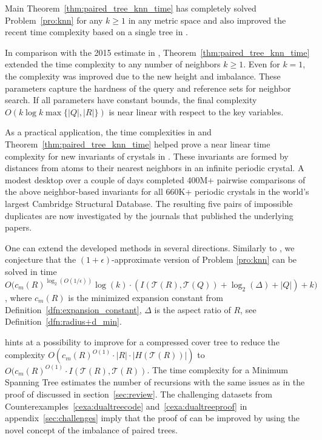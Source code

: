 \documentclass[a4paper,UKenglish,cleveref, autoref]{lipics-v2019}
\numberwithin{algocf}{section}
\theoremstyle{definition}
\theoremstyle{definition}
\theoremstyle{definition}
\theoremstyle{plain}
\newcommand{\T}{\mathcal{T}}
\newcommand{\ep}{\epsilon}
\begin{document}
Main Theorem~\ref{thm:paired_tree_knn_time} has completely solved Problem~\ref{pro:knn} for any $k\geq 1$ in any metric space and also improved the recent time complexity based on a single tree in \cite[Theorem~6.5]{elkin2021new}.
\medskip

In comparison with the 2015 estimate in \cite[Theorem~2]{curtin2015plug}, Theorem~\ref{thm:paired_tree_knn_time} extended the time complexity to any number of neighbors $k\geq 1$.
Even for $k=1$, the complexity was improved due to the new height and imbalance.
These parameters capture the hardness of the query and reference sets for neighbor search.
If all parameters have constant bounds, the final complexity $O(k\log k\max\{|Q|,|R|\})$ is near linear with respect to the key variables.
\medskip

As a practical application, the time complexities in \cite[Theorem~6.5]{elkin2021new} and Theorem~\ref{thm:paired_tree_knn_time} helped prove a near linear time complexity for new invariants of crystals in \cite[Theorem~14]{widdowson2022average}.
These invariants are formed by distances from atoms to their nearest neighbors in an infinite periodic crystal.
A modest desktop over a couple of days completed 400M+ pairwise comparisons of the above neighbor-based invariants for all 660K+ periodic crystals in the world's largest Cambridge Structural Database.
The resulting five pairs of impossible duplicates are now investigated by the journals that published the underlying papers.
\medskip

One can extend the developed methods in several directions.
Similarly to \cite[Theorem~7.4]{elkin2021new}, we conjecture that the $(1+\epsilon)$-approximate version of Problem \ref{pro:knn} can be solved in time $O\Big(c_m(R)^{\log_2(O(1/\ep))} \log(k) \cdot ( I(\T(R), \T(Q)) + \log_2(\Delta) + |Q|) + k \Big)$, where $c_m(R)$ is the minimized expansion constant from Definition~\ref{dfn:expansion_constant}, $\Delta$ is the aspect ratio of $R$, see Definition~\ref{dfn:radius+d_min}. 
\medskip

\cite[Section~2.3.1]{beygelzimer2006coverExtend} hints at a possibility to improve \cite[Algorithm~4.3]{elkin2021new} for a compressed cover tree to reduce the complexity $O(c_m(R)^{O(1)} \cdot |R| \cdot |H(\T(R))|)$ to $O(c_m(R)^{O(1)}\cdot I( \T(R) , \T(R))$.
The time complexity for a Minimum Spanning Tree \cite{EMST} estimates the number of recursions with the same issues as in the proof of \cite[Theorem~5]{beygelzimer2006cover} discussed in section~\ref{sec:review}.
The challenging datasets from Counterexamples~\ref{cexa:dualtreecode} and~\ref{cexa:dualtreeproof} in appendix~\ref{sec:challenges}
 imply that the proof of \cite[Theorem~5.1]{EMST} can be improved by using the novel concept of the imbalance of paired trees. 
\medskip
\end{document}
